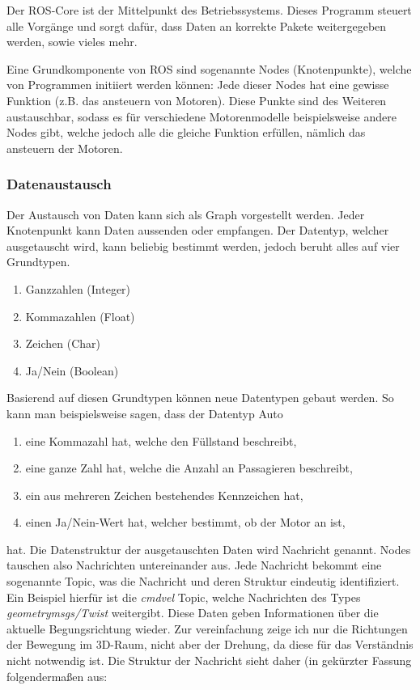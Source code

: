 {{{			Der ROS-Core ist der Mittelpunkt des Betriebssystems. Dieses Programm steuert alle Vorgänge und sorgt dafür, dass Daten an korrekte Pakete weitergegeben werden, sowie vieles mehr. 
			
			Eine Grundkomponente von ROS sind sogenannte Nodes (Knotenpunkte), welche von Programmen initiiert werden können: Jede dieser Nodes hat eine gewisse Funktion (z.B. das ansteuern von Motoren). Diese Punkte sind des Weiteren austauschbar, sodass es für verschiedene Motorenmodelle beispielsweise andere Nodes gibt, welche jedoch alle die gleiche Funktion erfüllen, nämlich das ansteuern der Motoren.
		}
		
		\subsubsection{Datenaustausch}
		{
			Der Austausch von Daten kann sich als Graph vorgestellt werden. Jeder Knotenpunkt kann Daten aussenden oder empfangen. Der Datentyp, welcher ausgetauscht wird, kann beliebig bestimmt werden, jedoch beruht alles auf vier Grundtypen.
			\begin{enumerate}
				\item Ganzzahlen (Integer)
				\item Kommazahlen (Float)
				\item Zeichen (Char)
				\item Ja/Nein (Boolean)
			\end{enumerate}
			Basierend auf diesen Grundtypen können neue Datentypen gebaut werden. So kann man beispielsweise sagen, dass der Datentyp Auto
			\begin{enumerate}
				\item eine Kommazahl hat, welche den Füllstand beschreibt,
				\item eine ganze Zahl hat, welche die Anzahl an Passagieren beschreibt,
				\item ein aus mehreren Zeichen bestehendes Kennzeichen hat,
				\item einen Ja/Nein-Wert hat, welcher bestimmt, ob der Motor an ist,
			\end{enumerate}
			
			hat. Die Datenstruktur der ausgetauschten Daten wird Nachricht genannt. Nodes tauschen also Nachrichten untereinander aus. Jede Nachricht bekommt eine sogenannte Topic, was die Nachricht und deren Struktur eindeutig identifiziert. Ein Beispiel hierfür ist die \textit{cmd\textunderscore vel} Topic, welche Nachrichten des Types \textit{geometry\textunderscore msgs/Twist} weitergibt. Diese Daten geben Informationen über die aktuelle Begungsrichtung wieder. Zur vereinfachung zeige ich nur die Richtungen der Bewegung im 3D-Raum, nicht aber der Drehung, da diese für das Verständnis nicht notwendig ist. Die Struktur der Nachricht sieht daher (in gekürzter Fassung folgendermaßen aus:
			\newline
			
}}}
